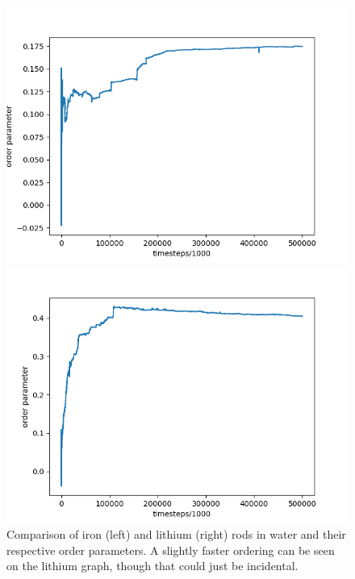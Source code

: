 \begin{figure}
\begin{minipage}[tc]{0.50\textwidth}
    \hspace{-0.2\textwidth}
    \includegraphics[width=1.3\textwidth]{data/med_comp2_L.png}
  \end{minipage}
  \hfill
  \begin{minipage}[tc]{0.50\textwidth}
    \includegraphics[width=1.3\textwidth]{data/med_comp2_R.png}
  \end{minipage}
    \caption{Comparison of iron (left) and lithium (right) rods in water and their respective order parameters. A slightly faster ordering can be seen on the lithium graph, though that could just be incidental.}
  \label{fig:med_comp2}
\end{figure}
